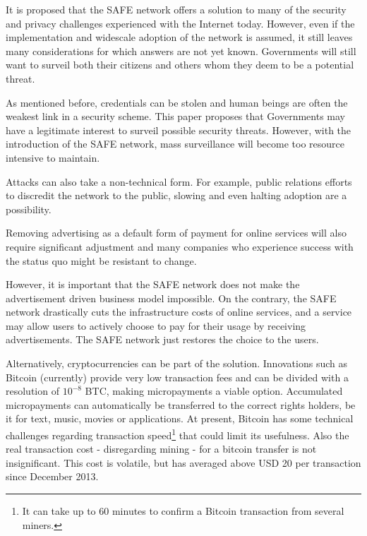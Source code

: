\documentclass[twocolumn,english]{article}
\begin{document}
It is proposed that the SAFE network offers a solution to many of
the security and privacy challenges experienced with the Internet
today. However, even if the implementation and widescale adoption
of the network is assumed, it still leaves many considerations for
which answers are not yet known. Governments will still want to surveil
both their citizens and others whom they deem to be a potential threat.

As mentioned before, credentials can be stolen and human beings are often the weakest link in a security scheme.  This paper proposes that Governments may have a legitimate interest to surveil possible security threats.  However, with the introduction of the SAFE network, mass surveillance will become too resource intensive to maintain.

Attacks can also take a non-technical
form. For example, public relations efforts to discredit the network
to the public, slowing and even halting adoption are a possibility.

Removing advertising as a default form of payment for online services will
also require significant adjustment and many companies who experience success with the status quo might be resistant to
change.

However, it is important that the SAFE network does not make the advertisement driven business model impossible.  On the contrary, the SAFE network drastically cuts the infrastructure costs of online services, and a service may allow users to actively choose to pay for their usage by receiving advertisements.  The SAFE network just restores the choice to the users.


Alternatively, cryptocurrencies can be part of the solution. Innovations such as Bitcoin (currently) provide very low transaction fees and can be divided with a resolution of $10^{-8}$ BTC, making micropayments a viable option. Accumulated micropayments can automatically be transferred to the correct rights holders, be it for text, music, movies or applications. At present, Bitcoin has some technical challenges regarding transaction speed\footnote{It can take up to 60 minutes to confirm a Bitcoin transaction from several miners.} that could limit its usefulness. Also the real transaction cost - disregarding mining - for a bitcoin transfer is not insignificant. This cost is volatile, but has averaged above USD 20 per transaction since December 2013\cite{blockchain14}.
\end{document}
